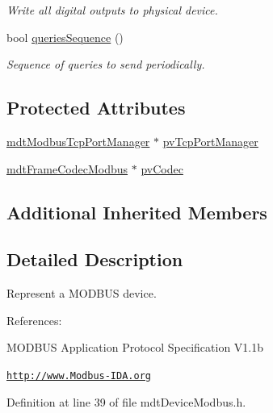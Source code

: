 \begin{DoxyCompactItemize}
\begin{DoxyCompactList}\small\item\em Write all digital outputs to physical device. \end{DoxyCompactList}\item 
bool \hyperlink{classmdt_device_modbus_a3b83b926ed1f9c3bdf7024de2745c285}{queries\-Sequence} ()
\begin{DoxyCompactList}\small\item\em Sequence of queries to send periodically. \end{DoxyCompactList}\end{DoxyCompactItemize}
\subsection*{Protected Attributes}
\begin{DoxyCompactItemize}
\item 
\hyperlink{classmdt_modbus_tcp_port_manager}{mdt\-Modbus\-Tcp\-Port\-Manager} $\ast$ \hyperlink{classmdt_device_modbus_a9ecbac63c29b229ab01f5fdb26008c95}{pv\-Tcp\-Port\-Manager}
\item 
\hyperlink{classmdt_frame_codec_modbus}{mdt\-Frame\-Codec\-Modbus} $\ast$ \hyperlink{classmdt_device_modbus_a2171d37ea720d546934f1c841e3c4d26}{pv\-Codec}
\end{DoxyCompactItemize}
\subsection*{Additional Inherited Members}


\subsection{Detailed Description}
Represent a M\-O\-D\-B\-U\-S device. 

References\-:
\begin{DoxyItemize}
\item M\-O\-D\-B\-U\-S Application Protocol Specification V1.\-1b
\item \href{http://www.Modbus-IDA.org}{\tt http\-://www.\-Modbus-\/\-I\-D\-A.\-org} 
\end{DoxyItemize}

Definition at line 39 of file mdt\-Device\-Modbus.\-h.



